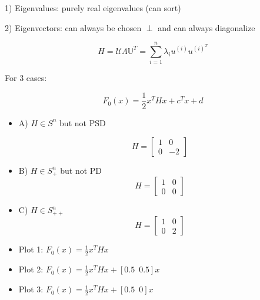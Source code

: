 1) Eigenvalues: purely real eigenvalues (can sort)

2) Eigenvectors: can always be chosen $\perp$ and can always diagonalize

\begin{equation*}
H = \mathcal{U}\Lambda \mathbb{U}^T  = \sum^n_{i=1}\lambda_iu^{(i)}u^{(i)^T}
\end{equation*}

For 3 cases:

\begin{equation*}
F_0(x) = \frac{1}{2}x^THx + c^Tx + d
\end{equation*}

\begin{itemize}
	\item A) $H\in S^n$ but not PSD
	
	\begin{equation*}
	H = 
	\begin{bmatrix}
	1&0\\
	0&-2
	\end{bmatrix}
	\end{equation*}
	
	\item B) $H\in S^n_+$ but not PD
	\begin{equation*}
	H = 
	\begin{bmatrix}
	1&0\\
	0&0
	\end{bmatrix}
	\end{equation*}
	
	\item C) $H\in S^n_{++}$
	\begin{equation*}
	H = \begin{bmatrix}
	1&0\\
	0&2
	\end{bmatrix}
	\end{equation*}
\end{itemize}



\begin{itemize}
	\item Plot 1: $F_0(x) =\frac{1}{2}x^THx$
	
	\item Plot 2: $F_0(x) =\frac{1}{2}x^THx + [0.5\,\,\, 0.5]x$
	
	\item Plot 3: $F_0(x) =\frac{1}{2}x^THx + [0.5\,\,\, 0]x$
\end{itemize}




